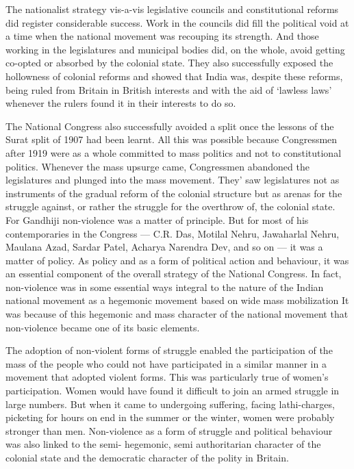 \begin{multicols}{2}
The nationalist strategy vis-a-vis legislative councils and constitutional reforms did register considerable success. Work in the councils did fill the political void at a time when the national movement was recouping its strength. And those working in the legislatures and municipal bodies did, on the whole, avoid getting co-opted or absorbed by the colonial state. They also successfully exposed the hollowness of colonial reforms and showed that India was, despite these reforms, being ruled from Britain in British interests and with the aid of `lawless laws' whenever the rulers found it in their interests to do so.

The National Congress also successfully avoided a split once the lessons of the Surat split of 1907 had been learnt. All this was possible because Congressmen after 1919 were as a whole committed to mass politics and not to constitutional politics. Whenever the mass upsurge came, Congressmen abandoned the legislatures and plunged into the mass movement. They' saw legislatures not as instruments of the gradual reform of the colonial structure but as arenas for the struggle against, or rather the struggle for the overthrow of, the colonial state. For Gandhiji non-violence was a matter of principle. But for most of his contemporaries in the Congress --- C.R. Das, Motilal Nehru, Jawaharlal Nehru, Maulana Azad, Sardar Patel, Acharya Narendra Dev, and so on --- it was a matter of policy. As policy and as a form of political action and behaviour, it was an essential component of the overall strategy of the National Congress. In fact, non-violence was in some essential ways integral to the nature of the Indian national movement as a hegemonic movement based on wide mass mobilization It was because of this hegemonic and mass character of the national movement that non-violence became one of its basic elements.

The adoption of non-violent forms of struggle enabled the participation of the mass of the people who could not have participated in a similar manner in a movement that adopted violent forms. This was particularly true of women's participation. Women would have found it difficult to join an armed struggle in large numbers. But when it came to undergoing suffering, facing lathi-charges, picketing for hours on end in the summer or the winter, women were probably stronger than men. Non-violence as a form of struggle and political behaviour was also linked to the semi- hegemonic, semi authoritarian character of the colonial state and the democratic character of the polity in Britain.


\end{multicols}
